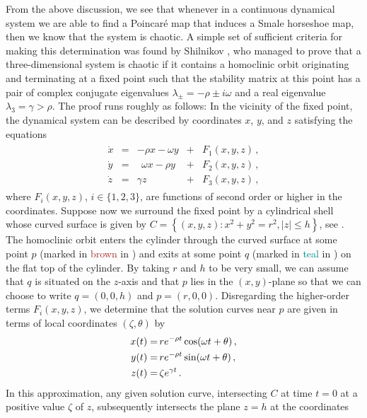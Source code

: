 From the above discussion, we see that whenever in a continuous dynamical system we are able to find a Poincar\'e map that induces a Smale horseshoe map, then we know that the system is chaotic. A simple set of sufficient criteria for making this determination was found by Shilnikov \cite{shilnikov1965case}, who managed to prove that a three-dimensional system is chaotic if it contains a homoclinic orbit originating and terminating at a fixed point such that the stability matrix at this point has a pair of complex conjugate eigenvalues $\lambda_\pm = -\rho \pm i \omega$ and a real eigenvalue $\lambda_3=\gamma > \rho$. The proof runs roughly as follows: In the vicinity of the fixed point, the dynamical system can be described by coordinates $x$, $y$, and $z$ satisfying the equations
\begin{gather}
    \begin{array}{rclcl}
\dot x &=&  -\rho x - \omega y &+& F_1(x,y,z) \,,\\
\dot y &=& ~~\omega x - \rho y  &+& F_2(x,y,z)\,,\\
\dot z &=& \gamma z &+& F_3(x,y,z)\,,
\end{array}
\end{gather}
where $F_i(x,y,z)$, $i \in \{1,2,3 \}$, are functions of second order or higher in the coordinates.
Suppose now we surround the fixed point by a cylindrical shell whose curved surface is given by $C=\left\{(x,y,z): x^2+y^2 = r^2 , |z| \leq h \right\}$, see . The homoclinic orbit enters the cylinder through the curved surface at some point $p$ (marked in \textcolor{brown}{brown} in ) and exits at some point $q$ (marked in \textcolor{teal}{teal} in ) on the flat top of the cylinder. By taking $r$ and $h$ to be very small, we can assume that $q$ is situated on the $z$-axis and that $p$ lies in the $(x,y)$-plane so that we can choose to write $q=(0,0,h)$ and $p=(r,0,0)$. Disregarding the higher-order terms $F_i(x,y,z)$, we determine that the solution curves near $p$ are given in terms of local coordinates $(\zeta,\theta)$ by
\begin{align}
    x(t) =&\, r e^{-\rho t} \cos(\omega t + \theta)\,, \notag  \\
    y(t) =&\, r e^{-\rho t} \sin(\omega t +\theta)\,,\\
    z(t) =&\, \zeta e^{\gamma t}\,. \notag 
\end{align}
In this approximation, any given solution curve, intersecting $C$ at time $t=0$ at a positive value $\zeta$ of $z$, subsequently intersects the plane $z=h$ at the coordinates
